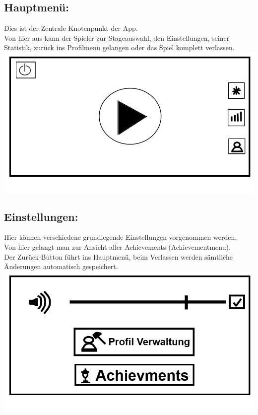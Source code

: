 \documentclass{scrartcl}
\begin{document}
\begin{enumerate}
	\begin{minipage}{1\textwidth}
		\item \subsection*{Hauptmenü:} \label{appaufbau:Hauptmenü}
		Dies ist der Zentrale Knotenpunkt der App.\\
		Von hier aus kann der Spieler zur Stageauswahl, den Einstellungen, seiner Statistik, zurück ins Profilmenü gelangen oder das Spiel komplett verlassen.\\
		\includegraphics[width=\textwidth]{assets/Mainmenu}
	\end{minipage}
	
	\begin{minipage}{1\textwidth}
		\item \subsection*{Einstellungen:}
		Hier können verschiedene grundlegende Einstellungen vorgenommen werden.\\
		Von hier gelangt man zur Ansicht aller Achievements (Achievementmenu).\\
		Der Zurück-Button führt ins Hauptmenü, beim Verlassen werden sämtliche Änderungen automatisch gespeichert.\\
		\includegraphics[width=\textwidth]{assets/Einstellungen}
	\end{minipage}


\end{enumerate}
\end{document}
